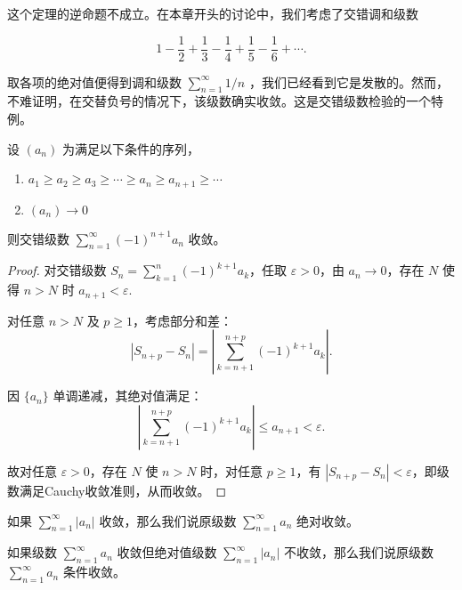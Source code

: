 这个定理的逆命题不成立。在本章开头的讨论中，我们考虑了交错调和级数

\[
1 - \frac{1}{2} + \frac{1}{3} - \frac{1}{4} + \frac{1}{5} - \frac{1}{6} + \cdots .
\]

取各项的绝对值便得到调和级数 \(\mathop{\sum }\limits_{{n = 1}}^{\infty }1/n\) ，我们已经看到它是发散的。然而，不难证明，在交替负号的情况下，该级数确实收敛。这是交错级数检验的一个特例。

\begin{Thm}[交错级数检验]
  \label{thm:2.7.7}
  设 \(\left( {a}_{n}\right)\) 为满足以下条件的序列，
\begin{enumerate}[label = (\roman*)]
\item \({a}_{1} \geq  {a}_{2} \geq  {a}_{3} \geq  \cdots  \geq  {a}_{n} \geq  {a}_{n + 1} \geq  \cdots\) 
\item \(\left( {a}_{n}\right)  \rightarrow  0\)
\end{enumerate}
则交错级数 \(\mathop{\sum }\limits_{{n = 1}}^{\infty }{\left( -1\right) }^{n + 1}{a}_{n}\) 收敛。
\end{Thm}


\begin{proof}


对交错级数 \( S_n = \sum_{k=1}^n (-1)^{k+1} a_k \)，任取 \( \varepsilon >0 \)，由 \( a_n \to 0 \)，存在 \( N \) 使得 \( n > N \) 时 \( a_{n+1} < \varepsilon \).

对任意 \( n > N \) 及 \( p \geq 1 \)，考虑部分和差：  
\[
|S_{n+p} - S_n| = \left| \sum_{k=n+1}^{n+p} (-1)^{k+1} a_k \right|.
\]

因 \( \{a_n\} \) 单调递减，其绝对值满足：  
\[
\left| \sum_{k=n+1}^{n+p} (-1)^{k+1} a_k \right| \leq a_{n+1} < \varepsilon.
\]

故对任意 \( \varepsilon >0 \)，存在 \( N \) 使 \( n > N \) 时，对任意 \( p \geq1 \)，有 \( |S_{n+p}-S_n| < \varepsilon \)，即级数满足Cauchy收敛准则，从而收敛。

\end{proof}


\begin{Def}
  \label{def:2.7.8}
  如果 \(\mathop{\sum }\limits_{{n = 1}}^{\infty }\left| {a}_{n}\right|\) 收敛，那么我们说原级数 \(\mathop{\sum }\limits_{{n = 1}}^{\infty }{a}_{n}\) 绝对收敛。

  如果级数 \(\mathop{\sum }\limits_{{n = 1}}^{\infty }{a}_{n}\) 收敛但绝对值级数 \(\mathop{\sum }\limits_{{n = 1}}^{\infty }\left| {a}_{n}\right|\) 不收敛，那么我们说原级数 \(\mathop{\sum }\limits_{{n = 1}}^{\infty }{a}_{n}\) 条件收敛。
\end{Def}


